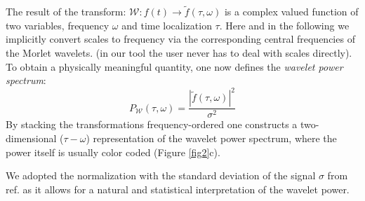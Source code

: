 The result of the transform: $\mathcal{W}: f(t) \rightarrow \widetilde{f}(\tau,\omega)$ is a complex valued function of two variables, frequency $\omega$ and time localization $\tau$. Here and in the following we implicitly convert scales to frequency via the corresponding central frequencies of the Morlet wavelets. (in our tool the user never has to deal with scales directly). To obtain a physically meaningful quantity, one now defines the \textit{wavelet power spectrum}:
\begin{equation}
P_\mathcal{W}(\tau, \omega) = \frac{|\widetilde{f}(\tau, \omega)|^2}{\sigma^2}
\end{equation}
By stacking the transformations frequency-ordered one constructs a two-dimensional ($\tau-\omega$) representation of the wavelet power spectrum, where the power itself is usually color coded (Figure \ref{fig2}c).


We adopted the normalization with the standard deviation of the signal $\sigma$ from ref. \cite{Torrence1998} as it allows for a natural and statistical interpretation of the wavelet power.

